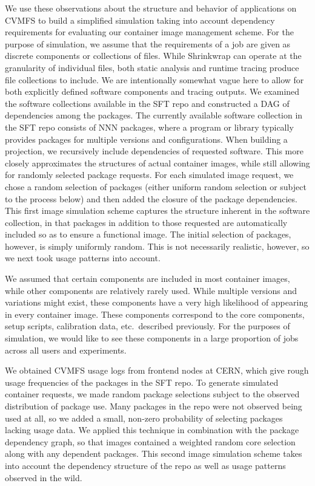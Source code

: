 \documentclass[sigconf]{acmart}
\begin{document}
We use these observations about the structure and behavior of applications on CVMFS to build a simplified simulation taking into account dependency requirements for evaluating our container image management scheme.
For the purpose of simulation,
we assume that the requirements of a job are given as discrete components or collections of files.
While Shrinkwrap can operate at the granularity of individual files,
both static analysis and runtime tracing produce file collections to include.
We are intentionally somewhat vague here to allow for both explicitly defined software components and tracing outputs.
We examined the software collections available in the SFT repo and constructed a DAG of dependencies among the packages.
The currently available software collection in the SFT repo consists of NNN packages,
where a program or library typically provides packages for multiple versions and configurations.
When building a projection,
we recursively include dependencies of requested software.
This more closely approximates the structures of actual container images,
while still allowing for randomly selected package requests.
For each simulated image request,
we chose a random selection of packages (either uniform random selection or subject to the process below)
and then added the closure of the package dependencies.
This first image simulation scheme captures the structure inherent in the software collection,
in that packages in addition to those requested are automatically included so as to ensure a functional image.
The initial selection of packages,
however, is simply uniformly random.
This is not necessarily realistic, however,
so we next took usage patterns into account.

We assumed that certain components are included in most container images,
while other components are relatively rarely used.
While multiple versions and variations might exist,
these components have a very high likelihood of appearing in every container image.
These components correspond to the core components, setup scripts, calibration data, etc.\ described previously.
For the purposes of simulation,
we would like to see these components in a large proportion of jobs across all users and experiments.

We obtained CVMFS usage logs from frontend nodes at CERN,
which give rough usage frequencies of the packages in the SFT repo.
To generate simulated container requests,
we made random package selections subject to the observed distribution of package use.
Many packages in the repo were not observed being used at all,
so we added a small, non-zero probability of selecting packages lacking usage data.
We applied this technique in combination with the package dependency graph,
so that images contained a weighted random core selection along with any dependent packages.
This second image simulation scheme takes into account the dependency structure of the repo as well as usage patterns observed in the wild.
\end{document}
